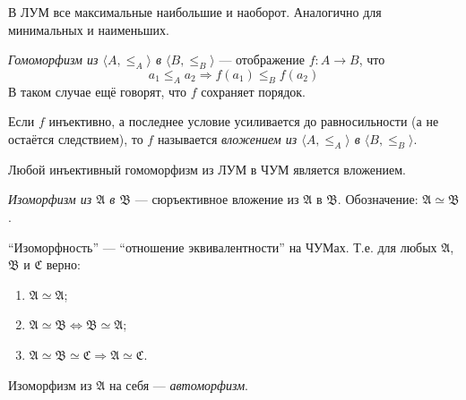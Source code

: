 \documentclass[12pt,a4paper]{article}
\begin{document}
    \begin{statement}
        В ЛУМ все максимальные наибольшие и наоборот. Аналогично для минимальных и наименьших.
    \end{statement}

    \begin{definition}
        \emph{Гомоморфизм из $\langle A, \leqslant_A \rangle$ в $\langle B, \leqslant_B \rangle$} --- отображение $f: A \to B$, что
        \[
            a_1 \leqslant_A a_2 \Rightarrow f(a_1) \leqslant_B f(a_2)
        \]
        В таком случае ещё говорят, что $f$ сохраняет порядок.

        Если $f$ инъективно, а последнее условие усиливается до равносильности (а не остаётся следствием), то $f$ называется \emph{вложением из $\langle A, \leqslant_A \rangle$ в $\langle B, \leqslant_B \rangle$}.
    \end{definition}

    \begin{statement}
        Любой инъективный гомоморфизм из ЛУМ в ЧУМ является вложением.
    \end{statement}

    \begin{definition}
        \emph{Изоморфизм из $\mathfrak{A}$ в $\mathfrak{B}$} --- сюръективное вложение из $\mathfrak{A}$ в $\mathfrak{B}$. Обозначение: $\mathfrak{A} \simeq \mathfrak{B}$.
    \end{definition}

    \begin{statement}
        ``Изоморфность'' --- ``отношение эквивалентности'' на ЧУМах. Т.е. для любых $\mathfrak{A}$, $\mathfrak{B}$ и $\mathfrak{C}$ верно:
        \begin{enumerate}
            \item $\mathfrak{A} \simeq \mathfrak{A}$;
            \item $\mathfrak{A} \simeq \mathfrak{B} \Leftrightarrow \mathfrak{B} \simeq \mathfrak{A}$;
            \item $\mathfrak{A} \simeq \mathfrak{B} \simeq \mathfrak{C} \Rightarrow \mathfrak{A} \simeq \mathfrak{C}$.
        \end{enumerate}
    \end{statement}

    \begin{definition}
        Изоморфизм из $\mathfrak{A}$ на себя --- \emph{автоморфизм}.
    \end{definition}
\end{document}
